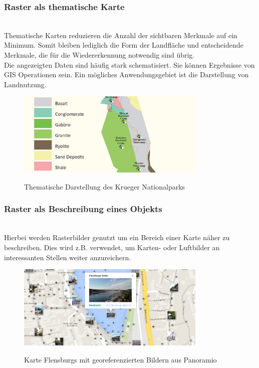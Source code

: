 \documentclass[10pt,conference,compsocconf]{IEEEtran}
\begin{document}
\subsubsection{Raster als thematische Karte}\hspace*{\fill} \\
Thematische Karten reduzieren die Anzahl der sichtbaren Merkmale auf ein Minimum. Somit bleiben lediglich die Form der Landfläche und entscheidende Merkmale, die für die Wiedererkennung notwendig sind übrig.\\
Die angezeigten Daten sind häufig stark schematisiert. Sie können Ergebnisse von GIS Operationen sein. Ein mögliches Anwendungsgebiet ist die Darstellung von Landnutzung. 
\begin{figure}[H]
  \centering
  	\includegraphics[height=114pt]{img/gis_thematisch}\\
  \caption[]{Thematische Darstellung des Krueger Nationalparks\footnotemark}
  \label{img:gis_thematisch}
\end{figure}

\subsubsection{Raster als Beschreibung eines Objekts}\hspace*{\fill} \\
Hierbei werden Rasterbilder genutzt um ein Bereich einer Karte näher zu beschreiben. Dies wird z.B. verwendet, um Karten- oder Luftbilder an interessanten Stellen weiter anzureichern. 

\begin{figure}[H]
  \centering
  	\includegraphics[height=114pt]{img/gis_beschreibung_object}\\
  \caption[]{Karte Flensburgs mit georeferenzierten Bildern aus Panoramio\footnotemark}
  \label{img:gis_beschreibung_object}
\end{figure}
\end{document}
